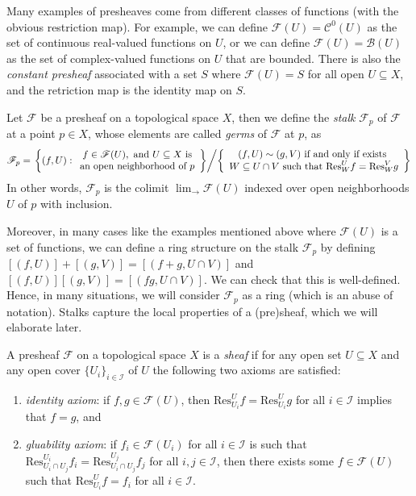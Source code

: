 \documentclass[11pt]{book}
\begin{document}
Many examples of presheaves come from different classes of functions (with the obvious restriction map). For example, we can define $\mathscr{F}(U)=\mathscr{C}^0(U)$ as the set of continuous real-valued functions on $U$, or we can define $\mathscr{F}(U)=\mathscr{B}(U)$ as the set of complex-valued functions on $U$ that are bounded. There is also the \textit{constant presheaf} associated with a set $S$ where $\mathscr{F}(U)=S$ for all open $U\subseteq X$, and the retriction map is the identity map on $S$.
\begin{definition}Let $\mathscr{F}$ be a presheaf on a topological space $X$, then we define the \textit{stalk} $\mathscr{F}_p$ of $\mathscr{F}$ at a point $p\in X$, whose elements are called \textit{germs} of $\mathscr{F}$ at $p$, as
\[\mathscr{F}_p=\left.\left\{(f,U):\begin{array}{c}f\in\mathscr{F}(U),\textrm{\ and\ }U\subseteq X\textrm{\ is}\\\textrm{an\ open\ neighborhood\ of\ }p\end{array}\right\} \middle/ \left\{\begin{array}{c}(f,U)\sim (g,V)\textrm{\ if\ and\ only\ if\ exists\ }\\W\subseteq U\cap V\textrm{\ such\ that\ }\mathrm{Res}^U_Wf=\mathrm{Res}^V_Wg\end{array}\right\}\right.\]
In other words, $\mathscr{F}_p$ is the colimit $\displaystyle\lim_{\longrightarrow}\mathscr{F}(U)$ indexed over open neighborhoods $U$ of $p$ with inclusion.
\end{definition}
Moreover, in many cases like the examples mentioned above where $\mathscr{F}(U)$ is a set of functions, we can define a ring structure on the stalk $\mathscr{F}_p$ by defining $[(f,U)]+[(g,V)]=[(f+g,U\cap V)]$ and $[(f,U)][(g,V)]=[(fg,U\cap V)]$. We can check that this is well-defined. Hence, in many situations, we will consider $\mathscr{F}_p$ as a ring (which is an abuse of notation). Stalks capture the local properties of a (pre)sheaf, which we will elaborate later.
\begin{definition}A presheaf $\mathscr{F}$ on a topological space $X$ is a \textit{sheaf} if for any open set $U\subseteq X$ and any open cover $\{U_i\}_{i\in\mathcal{I}}$ of $U$ the following two axioms are satisfied:
\begin{enumerate}[label=(\roman*)]
	\item \textit{identity axiom}: if $f,g\in\mathscr{F}(U)$, then $\mathrm{Res}^U_{U_i}f=\mathrm{Res}^U_{U_i}g$ for all $i\in\mathcal{I}$ implies that $f=g$, and
	\item \textit{gluability axiom}: if $f_i\in \mathscr{F}(U_i)$ for all $i\in\mathcal{I}$ is such that $\mathrm{Res}^{U_i}_{U_i\cap U_j}f_i=\mathrm{Res}^{U_j}_{U_i\cap U_j}f_j$ for all $i,j\in\mathcal{I}$, then there exists some $f\in\mathscr{F}(U)$ such that $\mathrm{Res}^U_{U_i}f=f_i$ for all $i\in\mathcal{I}$.
\end{enumerate}
\end{definition}
\end{document}
